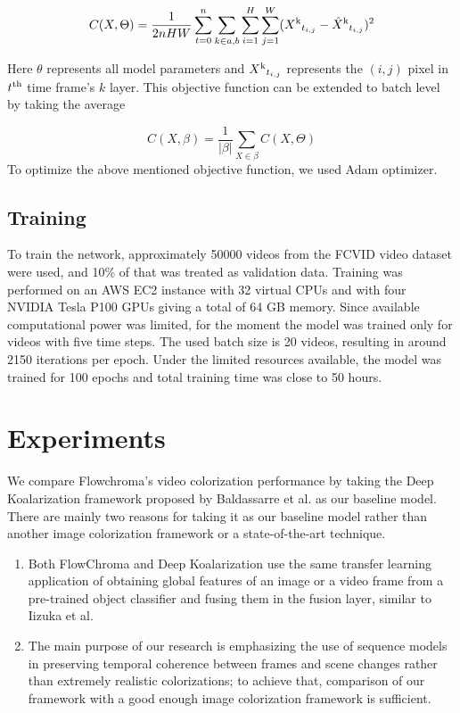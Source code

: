 \documentclass[10pt,twocolumn,letterpaper]{article}
\begin{document}
\begin{equation}
\small
C(X,\Theta ) = \frac{1}{2nHW}\sum_{t=0}^{n}\sum_{k\in {a,b}}\sum_{i=1}^{H}\sum_{j=1}^{W} (X\textsuperscript{k}_{t_{i,j}} - \hat{X}\textsuperscript{k}_{t_{i,j}}) ^ 2
\end{equation}

Here $\theta$ represents all model parameters and $X\textsuperscript{k}_{t_{i,j}}$ represents the $(i,j)$ pixel in $t\textsuperscript{th}$ time frame's $k$ layer. This objective function can be extended to batch level by taking the average 

\begin{equation}
C(X,\beta) = \frac{1}{\left | \beta  \right |}\sum_{X\in {\beta}} C(X,\Theta)
\end{equation}
To optimize the above mentioned objective function, we used Adam optimizer. \cite{DBLP:journals/corr/KingmaB14}

\subsection{Training}
To train the network, approximately 50000 videos from the FCVID \cite{FCVID} video dataset were used, and 10\% of that was treated as validation data. Training was performed on an AWS EC2 instance with 32 virtual CPUs and with four NVIDIA Tesla P100 GPUs giving a total of 64 GB memory. 
Since available computational power was limited, for the moment the model was trained only for videos with five time steps. The used batch size is 20 videos, resulting in around 2150 iterations per epoch. Under the limited resources available, the model was trained for 100 epochs and total training time was close to 50 hours. 

\section{Experiments}
We compare Flowchroma’s video colorization performance by taking the Deep Koalarization framework proposed by Baldassarre et al. as our baseline model. There are mainly two reasons for taking it as our baseline model rather than another image colorization framework or a state-of-the-art technique.
\begin{enumerate}
\item Both FlowChroma and Deep Koalarization use the same transfer learning application of obtaining global features of an image or a video frame from a pre-trained object classifier and fusing them in the fusion layer, similar to Iizuka et al. 
\item The main purpose of our research is emphasizing the use of sequence models in preserving temporal coherence between frames and scene changes rather than extremely realistic colorizations; to achieve that, comparison of our framework with a good enough image colorization framework is sufficient.
\end{enumerate}
\end{document}
